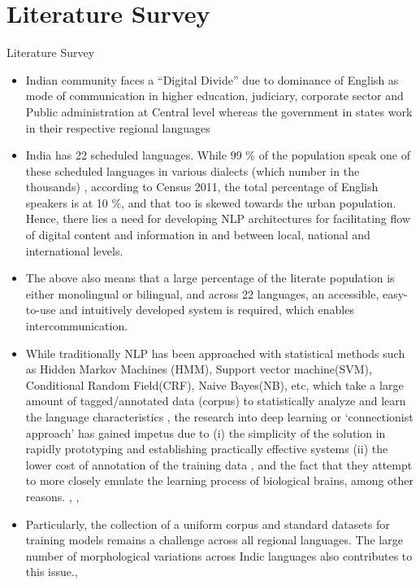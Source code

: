 \documentclass{beamer}
\begin{document}
\section{Literature Survey}
	\begin{frame}[allowframebreaks]{Literature Survey}
	\begin{itemize}
		\item Indian community faces a “Digital Divide” due to dominance of English as mode of communication in higher education, judiciary, corporate sector and Public administration at Central level whereas the government in states work in their respective regional languages \cite{kurian2008natural} 
		\item India has 22 scheduled languages. While 99 \%  of the population speak one of these scheduled languages in various dialects (which number in the thousands) \cite{theindianexpress_2018}, according to Census 2011, the total percentage of English speakers is at 10 \%, and that too is skewed towards the urban population. \cite{s_2019} Hence, there lies a need for developing NLP architectures for facilitating flow of digital content and information in and between local, national and international levels.
		\item The above also means that a large percentage of the literate population is either monolingual or bilingual, and across 22 languages, an accessible, easy-to-use and intuitively developed system is required, which enables intercommunication.
		\item While traditionally NLP has been approached with statistical methods such as Hidden Markov Machines (HMM), Support vector machine(SVM), Conditional Random Field(CRF), Naive Bayes(NB), etc, which take a large amount of tagged/annotated data (corpus) to statistically analyze and learn the language characteristics \cite{desai2021taxonomic}, the research into deep learning or ‘connectionist approach’ \cite{desai2021taxonomic} has gained impetus due to (i) the simplicity of the solution in rapidly prototyping and establishing practically effective systems (ii) the lower cost of annotation of the training data \cite{philip2019baseline}, and the fact that they attempt to more closely emulate the learning process of biological brains, among other reasons. \cite{desai2021taxonomic}, \cite{rosca2016sequence}, \cite{deselaers2009deep}
		\item Particularly, the collection of a uniform corpus and standard datasets for training models remains a challenge across all regional languages. The large number of morphological variations across Indic languages also contributes to this issue.\cite{kunchukuttan2020ai4bharat}, \cite{singhnlp}

\end{itemize}
\end{frame}
\end{document}
